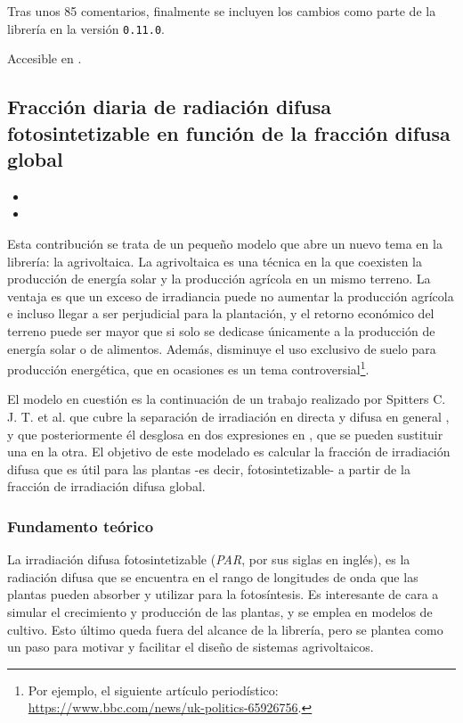 Tras unos 85 comentarios, finalmente se incluyen los cambios como parte de la librería en la versión \texttt{0.11.0}.

Accesible en .

\subsection{Fracción diaria de radiación difusa fotosintetizable en función de la fracción difusa global}

\begin{itemize}
    \item {}
    \item {}
\end{itemize}

Esta contribución se trata de un pequeño modelo que abre un nuevo tema en la librería: la \gls{agrivoltaica}. La agrivoltaica es una técnica en la que coexisten la producción de energía solar y la producción agrícola en un mismo terreno. La ventaja es que un exceso de irradiancia puede no aumentar la producción agrícola e incluso llegar a ser perjudicial para la plantación, y el retorno económico del terreno puede ser mayor que si solo se dedicase únicamente a la producción de energía solar o de alimentos. Además, disminuye el uso exclusivo de suelo para producción energética, que en ocasiones es un tema controversial\footnote{Por ejemplo, el siguiente artículo periodístico: \url{https://www.bbc.com/news/uk-politics-65926756}.}.

El modelo en cuestión es la continuación de un trabajo realizado por Spitters C. J. T. et al. que cubre la separación de \gls{irradiación} en \gls{directa} y \gls{difusa} en general \cite{Spitters_Toussaint_Goudriaan_1986}, y que posteriormente él desglosa en dos expresiones en \cite{Spitters_1986}, que se pueden sustituir una en la otra. El objetivo de este modelado es calcular la fracción de irradiación difusa que es útil para las plantas -es decir, fotosintetizable- a partir de la fracción de irradiación difusa global.

\subsubsection{Fundamento teórico}

La \gls{irradiación} difusa fotosintetizable (\textit{PAR}, por sus siglas en inglés), es la radiación difusa que se encuentra en el rango de longitudes de onda que las plantas pueden absorber y utilizar para la fotosíntesis. Es interesante de cara a simular el crecimiento y producción de las plantas, y se emplea en modelos de cultivo. Esto último queda fuera del alcance de la librería, pero se plantea como un paso para motivar y facilitar el diseño de sistemas agrivoltaicos.

